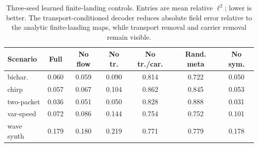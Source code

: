 \begin{table}[t]
\centering
\caption{Three-seed learned finite-landing controls.  Entries are mean relative $\ell^2$; lower is better.  The transport-conditioned decoder reduces absolute field error relative to the analytic finite-landing maps, while transport removal and carrier removal remain visible.}
\label{tab:learned-landing-controls}
\scriptsize
\begin{tabular}{lcccccc}
\toprule
Scenario & Full & No flow & No tr. & No tr./car. & Rand. meta & No sym. \\
\midrule
bichar. & 0.060 & 0.059 & 0.090 & 0.814 & 0.722 & 0.050 \\
chirp & 0.057 & 0.067 & 0.104 & 0.862 & 0.845 & 0.053 \\
two-packet & 0.036 & 0.051 & 0.050 & 0.828 & 0.888 & 0.031 \\
var-speed & 0.072 & 0.086 & 0.144 & 0.754 & 0.752 & 0.101 \\
wave synth & 0.179 & 0.180 & 0.219 & 0.771 & 0.779 & 0.178 \\
\bottomrule
\end{tabular}
\end{table}
